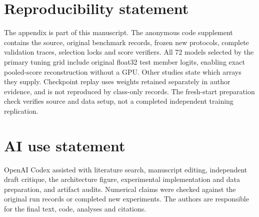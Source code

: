\documentclass{article}
\begin{document}
\section*{Reproducibility statement}
The appendix is part of this manuscript. The anonymous code supplement contains the source, original benchmark records, frozen new protocols, complete validation traces, selection locks and score verifiers. All 72 models selected by the primary tuning grid include original float32 test member logits, enabling exact pooled-score reconstruction without a GPU. Other studies state which arrays they supply. Checkpoint replay uses weights retained separately in author evidence, and is not reproduced by class-only records. The fresh-start preparation check verifies source and data setup, not a completed independent training replication.

\section*{AI use statement}
OpenAI Codex assisted with literature search, manuscript editing, independent draft critique, the architecture figure, experimental implementation and data preparation, and artifact audits. Numerical claims were checked against the original run records or completed new experiments. The authors are responsible for the final text, code, analyses and citations.



\clearpage
\appendix
\renewcommand{\thesection}{A\arabic{section}}

\end{document}
